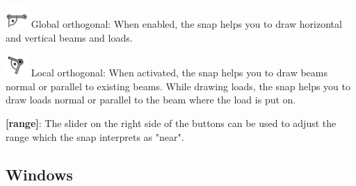 \documentclass[a4paper,11pt]{report}
\begin{document}
\begin{minipage}[h]{\textwidth-4cm}
\begin{trivlist}
	\item[] \includegraphics[scale = 0.5]{../../icons/ortho_g.png} Global orthogonal: When enabled, the snap helps you to draw horizontal and vertical beams and loads.
	\item[] \includegraphics[scale = 0.5]{../../icons/ortho_l.png} Local orthogonal: When activated, the snap helps you to draw beams normal or parallel to existing beams. While drawing loads, the snap helps you to draw loads normal or parallel to the beam where the load is put on.
	\item[] \textbf{[range]}: The slider on the right side of the buttons can be used to adjust the range which the snap interprets as "near".
\end{trivlist}
\end{minipage}


\subsection{Windows}
\end{document}
